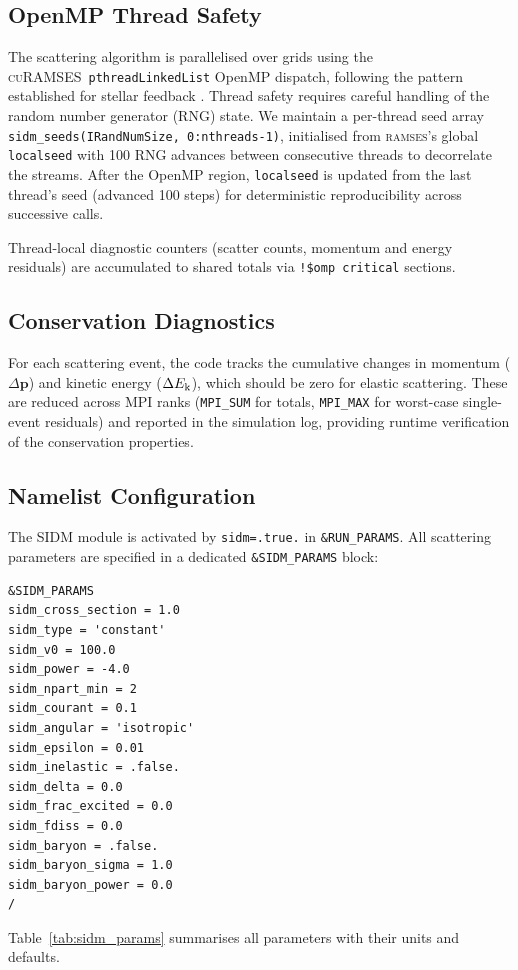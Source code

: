 \documentclass[fleqn,usenatbib]{mnras}
\newcommand{\ramses}{\textsc{ramses}}
\newcommand{\curamses}{\textsc{cuRAMSES}}
\newcommand{\code}[1]{\texttt{#1}}
\begin{document}
\subsection{OpenMP Thread Safety}
\label{sec:sidm_omp}

The scattering algorithm is parallelised over grids using the
\curamses\ \code{pthreadLinkedList} OpenMP dispatch, following the
pattern established for stellar feedback \citep{Kim2026}.  Thread
safety requires careful handling of the random number generator (RNG)
state.  We maintain a per-thread seed array
\code{sidm\_seeds(IRandNumSize, 0:nthreads-1)}, initialised from
\ramses's global \code{localseed} with 100 RNG advances between
consecutive threads to decorrelate the streams.  After the OpenMP
region, \code{localseed} is updated from the last thread's seed
(advanced 100 steps) for deterministic reproducibility across
successive calls.

Thread-local diagnostic counters (scatter counts, momentum and energy
residuals) are accumulated to shared totals via \code{!\$omp critical}
sections.

\subsection{Conservation Diagnostics}
\label{sec:sidm_conservation}

For each scattering event, the code tracks the cumulative changes in
momentum ($\Delta\mathbf{p}$) and kinetic energy ($\Delta E_{\rm k}$),
which should be zero for elastic scattering.  These are reduced across
MPI ranks (\code{MPI\_SUM} for totals, \code{MPI\_MAX} for
worst-case single-event residuals) and reported in the simulation log,
providing runtime verification of the conservation properties.

\subsection{Namelist Configuration}
\label{sec:sidm_namelist}

The SIDM module is activated by \code{sidm=.true.} in
\code{\&RUN\_PARAMS}.  All scattering parameters are specified in a
dedicated \code{\&SIDM\_PARAMS} block:
\begin{verbatim}
&SIDM_PARAMS
sidm_cross_section = 1.0
sidm_type = 'constant'
sidm_v0 = 100.0
sidm_power = -4.0
sidm_npart_min = 2
sidm_courant = 0.1
sidm_angular = 'isotropic'
sidm_epsilon = 0.01
sidm_inelastic = .false.
sidm_delta = 0.0
sidm_frac_excited = 0.0
sidm_fdiss = 0.0
sidm_baryon = .false.
sidm_baryon_sigma = 1.0
sidm_baryon_power = 0.0
/
\end{verbatim}
Table~\ref{tab:sidm_params} summarises all parameters with their
units and defaults.
\end{document}
